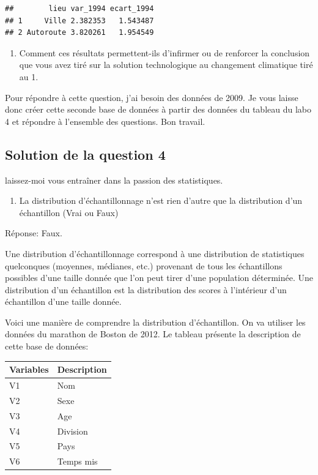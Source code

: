 \documentclass[
]{article}
\providecommand{\tightlist}{%
  \setlength{\itemsep}{0pt}\setlength{\parskip}{0pt}}
\begin{document}
\begin{verbatim}
##        lieu var_1994 ecart_1994
## 1     Ville 2.382353   1.543487
## 2 Autoroute 3.820261   1.954549
\end{verbatim}

\begin{enumerate}
\def\labelenumi{\arabic{enumi}.}
\setcounter{enumi}{2}
\tightlist
\item
  Comment ces résultats permettent-ils d'infirmer ou de renforcer la
  conclusion que vous avez tiré sur la solution technologique au
  changement climatique tiré au 1.
\end{enumerate}

Pour répondre à cette question, j'ai besoin des données de 2009. Je vous
laisse donc créer cette seconde base de données à partir des données du
tableau du labo 4 et répondre à l'ensemble des questions. Bon travail.

\hypertarget{solution-de-la-question-4}{%
\subsection{Solution de la question 4}\label{solution-de-la-question-4}}

laissez-moi vous entraîner dans la passion des statistiques.

\begin{enumerate}
\def\labelenumi{\arabic{enumi}.}
\setcounter{enumi}{4}
\tightlist
\item
  La distribution d'échantillonnage n'est rien d'autre que la
  distribution d'un échantillon (Vrai ou Faux)
\end{enumerate}

Réponse: Faux.

Une distribution d'échantillonnage correspond à une distribution de
statistiques quelconques (moyennes, médianes, etc.) provenant de tous
les échantillons possibles d'une taille donnée que l'on peut tirer d'une
population déterminée. Une distribution d'un échantillon est la
distribution des scores à l'intérieur d'un échantillon d'une taille
donnée.

Voici une manière de comprendre la distribution d'échantillon. On va
utiliser les données du marathon de Boston de 2012. Le tableau présente
la description de cette base de données:

\begin{longtable}[]{@{}ll@{}}
\toprule()
Variables & Description \\
\midrule()
\endhead
V1 & Nom \\
V2 & Sexe \\
V3 & Age \\
V4 & Division \\
V5 & Pays \\
V6 & Temps mis \\
\bottomrule()
\end{longtable}
\end{document}
